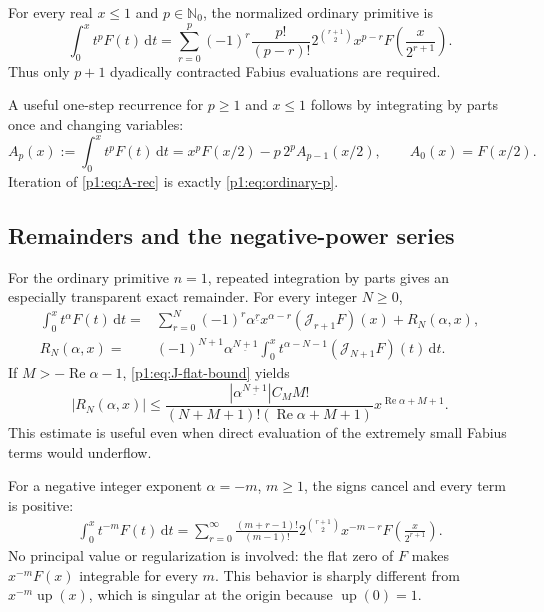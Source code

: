 \documentclass[11pt,oneside]{article}
\theoremstyle{definition}
\theoremstyle{remark}
\newcommand{\Up}{\operatorname{up}}
\newcommand{\N}{\mathbb N}
\newcommand{\dd}{\,\mathrm d}
\newcommand{\fall}[2]{#1^{\underline{#2}}}
\newcommand{\Jn}{\mathcal J}
\newcommand{\1}{\mathbf 1}
\DeclareMathOperator{\Rea}{Re}
\begin{document}
\begin{resultbox}
For every real \(x\leq1\) and \(p\in\N_0\), the normalized ordinary primitive
is
\begin{equation}
 \int_0^x t^pF(t)\dd t
 =\sum_{r=0}^{p}(-1)^r\frac{p!}{(p-r)!}
 2^{\binom{r+1}{2}}x^{p-r}
 F\!\left(\frac{x}{2^{r+1}}\right).                            \label{p1:eq:ordinary-p}
\end{equation}
Thus only \(p+1\) dyadically contracted Fabius evaluations are required.
\end{resultbox}

A useful one-step recurrence for \(p\geq1\) and \(x\leq1\) follows by
integrating by parts once and changing variables:
\begin{equation}
 A_p(x):=\int_0^xt^pF(t)\dd t
 =x^pF(x/2)-p\,2^pA_{p-1}(x/2),\qquad A_0(x)=F(x/2).             \label{p1:eq:A-rec}
\end{equation}
Iteration of \eqref{p1:eq:A-rec} is exactly \eqref{p1:eq:ordinary-p}.

\subsection{Remainders and the negative-power series}
For the ordinary primitive \(n=1\), repeated integration by parts gives an
especially transparent exact remainder.  For every integer \(N\geq0\),
\begin{align}
 \int_0^xt^\alpha F(t)\dd t
 ={}&\sum_{r=0}^{N}(-1)^r\fall{\alpha}{r}
 x^{\alpha-r}(\Jn_{r+1}F)(x)+R_N(\alpha,x),                    \label{p1:eq:partial-alpha}\\
 R_N(\alpha,x)
 ={}&(-1)^{N+1}\fall{\alpha}{N+1}
 \int_0^xt^{\alpha-N-1}(\Jn_{N+1}F)(t)\dd t.                  \label{p1:eq:remainder-alpha}
\end{align}
If \(M> -\Rea\alpha-1\), \eqref{p1:eq:J-flat-bound} yields
\begin{equation}
 |R_N(\alpha,x)|
 \leq
 \frac{|\fall{\alpha}{N+1}|C_MM!}
 {(N+M+1)!(\Rea\alpha+M+1)}
 x^{\Rea\alpha+M+1}.                                         \label{p1:eq:remainder-bound}
\end{equation}
This estimate is useful even when direct evaluation of the extremely small
Fabius terms would underflow.

For a negative integer exponent \(\alpha=-m\), \(m\geq1\), the signs cancel
and every term is positive:
\begin{equation}
 \boxed{\begin{aligned}
 \int_0^xt^{-m}F(t)\dd t
 =\sum_{r=0}^{\infty}
 \frac{(m+r-1)!}{(m-1)!}
 2^{\binom{r+1}{2}}x^{-m-r}
 F\!\left(\frac{x}{2^{r+1}}\right).
 \end{aligned}}                                                \label{p1:eq:negative-series}
\end{equation}
No principal value or regularization is involved: the flat zero of \(F\) makes
\(x^{-m}F(x)\) integrable for every \(m\).  This behavior is sharply different
from \(x^{-m}\Up(x)\), which is singular at the origin because \(\Up(0)=1\).
\end{document}
